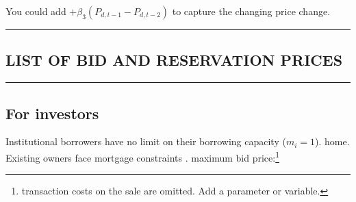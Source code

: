 {You could add $+ \beta_3 (P_{d,t-1}-P_{d,t-2})$ to capture the changing  price change. 











\newpage\hrule
\subsection{LIST OF BID AND RESERVATION PRICES}
\hrule




\subsection{For investors}
 Institutional borrowers have no limit on their borrowing capacity ($m_i=1$). home. Existing owners face mortgage constraints .
maximum bid price:\footnote{transaction costs on the sale are omitted. Add a parameter or variable.}

}
